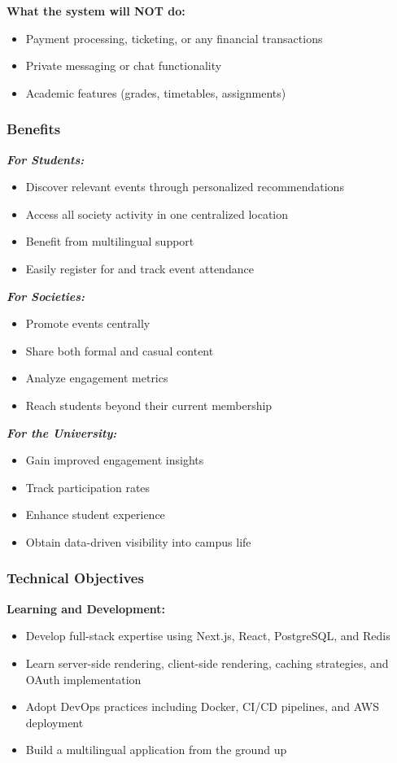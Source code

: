 \documentclass[12pt,a4paper]{article}
\begin{document}
\textbf{What the system will NOT do:}
\begin{itemize}
    \item Payment processing, ticketing, or any financial transactions
    \item Private messaging or chat functionality
    \item Academic features (grades, timetables, assignments)
\end{itemize}

\subsubsection{Benefits}

\textbf{\textit{For Students:}}
\begin{itemize}
    \item Discover relevant events through personalized recommendations
    \item Access all society activity in one centralized location
    \item Benefit from multilingual support
    \item Easily register for and track event attendance
\end{itemize}

\textbf{\textit{For Societies:}}
\begin{itemize}
    \item Promote events centrally
    \item Share both formal and casual content
    \item Analyze engagement metrics
    \item Reach students beyond their current membership
\end{itemize}

\textbf{\textit{For the University:}}
\begin{itemize}
    \item Gain improved engagement insights
    \item Track participation rates
    \item Enhance student experience
    \item Obtain data-driven visibility into campus life
\end{itemize}

\subsubsection{Technical Objectives}

\textbf{Learning and Development:}
\begin{itemize}
    \item Develop full-stack expertise using Next.js, React, PostgreSQL, and Redis
    \item Learn server-side rendering, client-side rendering, caching strategies, and OAuth implementation
    \item Adopt DevOps practices including Docker, CI/CD pipelines, and AWS deployment
    \item Build a multilingual application from the ground up
\end{itemize}
\end{document}
